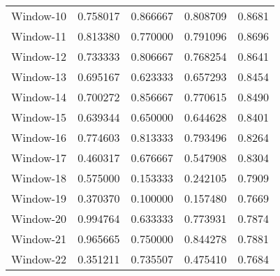 \begin{table}[h]
{\begin{tabular}{l*{4}c}
     Window-10 & 0.758017 & 0.866667 & 0.808709 & 0.8681 \\
     Window-11 & 0.813380 & 0.770000 & 0.791096 & 0.8696 \\
     Window-12 & 0.733333 & 0.806667 & 0.768254 & 0.8641 \\
     Window-13 & 0.695167 & 0.623333 & 0.657293 & 0.8454 \\
     Window-14 & 0.700272 & 0.856667 & 0.770615 & 0.8490 \\
     Window-15 & 0.639344 & 0.650000 & 0.644628 & 0.8401 \\
     Window-16 & 0.774603 & 0.813333 & 0.793496 & 0.8264 \\
     Window-17 & 0.460317 & 0.676667 & 0.547908 & 0.8304 \\
     Window-18 & 0.575000 & 0.153333 & 0.242105 & 0.7909 \\
     Window-19 & 0.370370 & 0.100000 & 0.157480 & 0.7669 \\
     Window-20 & 0.994764 & 0.633333 & 0.773931 & 0.7874 \\
     Window-21 & 0.965665 & 0.750000 & 0.844278 & 0.7881 \\
     Window-22 & 0.351211 & 0.735507 & 0.475410 & 0.7684\\
    \bottomrule[1.6pt]
    \end{tabular}
    }
  \end{table}

